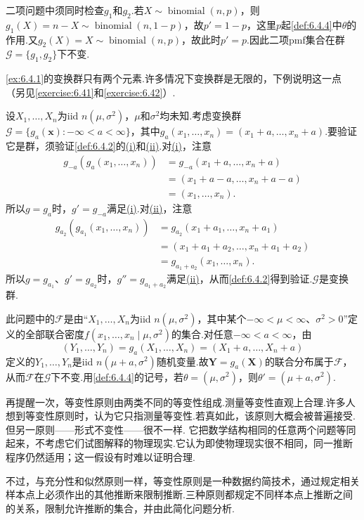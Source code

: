 \begin{example}\label{ex:6.4.5}
二项问题中须同时检查$g_1$和$g_2$.若$X\sim\operatorname{binomial}(n,p)$，则$g_1(X)=n-X\sim\operatorname{binomial}(n,1-p)$，故$p'=1-p$，这里$p$起\autoref{def:6.4.4}中$\theta$的作用.又$g_2(X)=X\sim\operatorname{binomial}(n,p)$，故此时$p'=p$.因此二项pmf集合在群$\mathcal G=\{g_1,g_2\}$下不变.
\end{example}
\autoref{ex:6.4.1}的变换群只有两个元素.许多情况下变换群是无限的，下例说明这一点（另见\autoref{exercise:6.41}和\autoref{exercise:6.42}）.
\begin{example}[正态位置不变性]\label{ex:6.4.6}
设$X_1,\ldots,X_n$为iid $n(\mu,\sigma^2)$，$\mu$和$\sigma^2$均未知.考虑变换群$\mathcal G=\{g_a(\boldsymbol x):-\infty<a<\infty\}$，其中$g_a(x_1,\ldots,x_n)=(x_1+a,\ldots,x_n+a)$.要验证它是群，须验证\autoref{def:6.4.2}的\hyperref[item:6.4.2i]{(i)}和\hyperref[item:6.4.2ii]{(ii)}.对\hyperref[item:6.4.2i]{(i)}，注意
\begin{align*}
g_{-a}(g_a(x_1,\ldots,x_n))&=g_{-a}(x_1+a,\ldots,x_n+a)\\
&=(x_1+a-a,\ldots,x_n+a-a)\\
&=(x_1,\ldots,x_n).
\end{align*}
所以$g=g_a$时，$g'=g_{-a}$满足\hyperref[item:6.4.2i]{(i)}.对\hyperref[item:6.4.2ii]{(ii)}，注意
\begin{align*}
g_{a_2}(g_{a_1}(x_1,\ldots,x_n))&=g_{a_2}(x_1+a_1,\ldots,x_n+a_1)\\
&=(x_1+a_1+a_2,\ldots,x_n+a_1+a_2)\\
&=g_{a_1+a_2}(x_1,\ldots,x_n).
\end{align*}
所以$g=g_{a_1}$、$g'=g_{a_2}$时，$g''=g_{a_1+a_2}$满足\hyperref[item:6.4.2ii]{(ii)}，从而\autoref{def:6.4.2}得到验证.$\mathcal G$是变换群.

此问题中的$\mathcal F$是由“$X_1,\ldots,X_n$为iid $n(\mu,\sigma^2)$，其中某个$-\infty<\mu<\infty$、$\sigma^2>0$”定义的全部联合密度$f(x_1,\ldots,x_n\mid\mu,\sigma^2)$的集合.对任意$-\infty<a<\infty$，由
$$(Y_1,\ldots,Y_n)=g_a(X_1,\ldots,X_n)=(X_1+a,\ldots,X_n+a)$$
定义的$Y_1,\ldots,Y_n$是iid $n(\mu+a,\sigma^2)$随机变量.故$\boldsymbol Y=g_a(\boldsymbol X)$的联合分布属于$\mathcal F$，从而$\mathcal F$在$\mathcal G$下不变.用\autoref{def:6.4.4}的记号，若$\theta=(\mu,\sigma^2)$，则$\theta'=(\mu+a,\sigma^2)$.
\end{example}
再提醒一次，等变性原则由两类不同的等变性组成.测量等变性直观上合理.许多人想到等变性原则时，认为它只指测量等变性.若真如此，该原则大概会被普遍接受.但另一原则——形式不变性——很不一样.
它把数学结构相同的任意两个问题等同起来，不考虑它们试图解释的物理现实.它认为即使物理现实很不相同，同一推断程序仍然适用；这一假设有时难以证明合理.

不过，与充分性和似然原则一样，等变性原则是一种数据约简技术，通过规定相关样本点上必须作出的其他推断来限制推断.三种原则都规定不同样本点上推断之间的关系，限制允许推断的集合，并由此简化问题分析.

